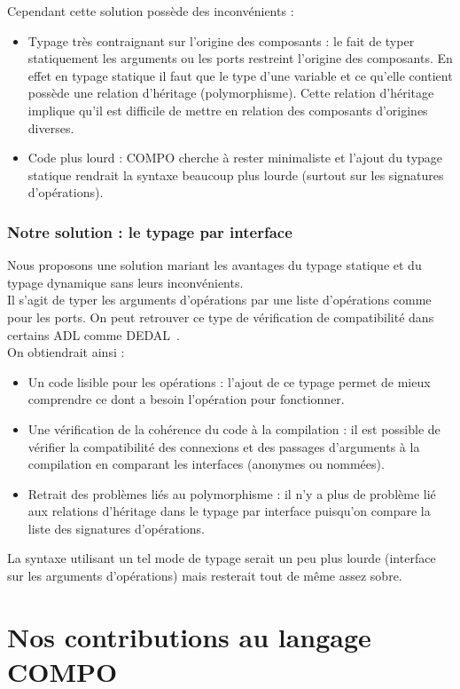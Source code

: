 \documentclass[11pt,a4paper,openany,oneside]{book}
\begin{document}
Cependant cette solution possède des inconvénients : 
\begin{itemize}
\item Typage très contraignant sur l'origine des composants : le fait de typer statiquement les arguments ou les ports restreint l'origine des composants. En effet en typage statique il faut que le type d'une variable et ce qu'elle contient possède une relation d'héritage (polymorphisme). Cette relation d'héritage implique qu'il est difficile de mettre en relation des composants d'origines diverses.
\item Code plus lourd : COMPO cherche à rester minimaliste et l'ajout du typage statique rendrait la syntaxe beaucoup plus lourde (surtout sur les signatures d'opérations).
\end{itemize}

\subsection{Notre solution : le typage par interface}
Nous proposons une solution mariant les avantages du typage statique et du typage dynamique sans leurs inconvénients.\\
Il s'agit de typer les arguments d'opérations par une liste d'opérations comme pour les ports. On peut retrouver ce type de vérification de compatibilité dans certains ADL comme DEDAL~\citep{dedal}.\\
On obtiendrait ainsi : 
\begin{itemize}
\item Un code lisible pour les opérations : l'ajout de ce typage permet de mieux comprendre ce dont a besoin l'opération pour fonctionner.
\item Une vérification de la cohérence du code à la compilation : il est possible de vérifier la compatibilité des connexions et des passages d'arguments à la compilation en comparant les interfaces (anonymes ou nommées).
\item Retrait des problèmes liés au polymorphisme : il n'y a plus de problème lié aux relations d'héritage dans le typage par interface puisqu'on compare la liste des signatures d'opérations.
\end{itemize}

La syntaxe utilisant un tel mode de typage serait un peu plus lourde (interface sur les arguments d'opérations) mais resterait tout de même assez sobre.

\chapter{Nos contributions au langage COMPO}
\end{document}
